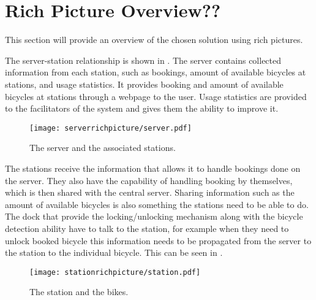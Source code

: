 \section{Rich Picture Overview??}
This section will provide an overview of the chosen solution using rich pictures.

The server-station relationship is shown in . 
The server contains collected information from each station, such as bookings, amount of available bicycles at stations, and usage statistics.
It provides booking and amount of available bicycles at stations through a webpage to the user. 
Usage statistics are provided to the facilitators of the system and gives them the ability to improve it. 

\begin{figure}[h]
\centering
\texttt{[image: serverrichpicture/server.pdf]}
\caption{The server and the associated stations.}
\label{fig:ServerRichPicture}
\end{figure}

The stations receive the information that allows it to handle bookings done on the server.
They also have the capability of handling booking by themselves, which is then shared with the central server.
Sharing information such as the amount of available bicycles is also something the stations need to be able to do.
The dock that provide the locking/unlocking mechanism along with the bicycle detection ability have to talk to the station, for example when they need to unlock booked bicycle this information needs to be propagated from the server to the station to the individual bicycle.
This can be seen in .

\begin{figure}[h]
\centering
\texttt{[image: stationrichpicture/station.pdf]}
\caption{The station and the bikes.}
\label{fig:StationRichPicture}
\end{figure}

\begin{comment}
\begin{figure}[h]
\centering
\begin{subfigure}[b]{0.3\textwidth}
\centering
\texttt{[image: Bicyclewithlock/bicylewithlock.pdf]}
\caption{Locked bicycle.}
\label{fig:BicycleLocked}
\end{subfigure}
~
\begin{subfigure}[b]{0.3\textwidth}
\centering
\texttt{[image: Bicyclewithoutlock/bicylewithoutlock.pdf]}
\caption{Unlocked bicycle.}
\label{fig:BicycleUnlocked}
\end{subfigure}
\caption{Rich picture of bicycle.}
\label{fig:Bicycles}
\end{figure}
\end{comment}